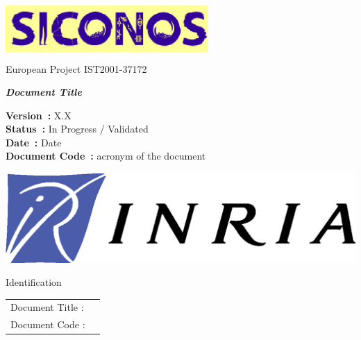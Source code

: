 \thispagestyle{empty}

\begin{center}
\includegraphics[height=23mm, width=77mm]{figure/siconos.eps}\\
\textsf{European Project IST2001-37172}\\[6cm]
\end{center}

\begin{center}
\huge
\textsf{\textbf{\textit{Document Title}}}\\[2.5cm]
\end{center}

\large
\begin{center}
\textsf{\textbf{Version~:} X.X}\\
\textsf{\textbf{Status~:}  In Progress / Validated}\\
\textsf{\textbf{Date~:} Date}\\
\textsf{\textbf{Document Code~:} acronym of the document}\\[5cm]

\end{center}

\normalsize

\begin{flushright}
\includegraphics[scale=0.3]{figure/Logo-INRIA.eps}
\end{flushright}

\clearpage


\normalsize

\begin{center}
  \textsf{\Large Identification}
\end{center}

\noindent\begin{tabular}{|p{}|p{}|}
\hline
Document Title : & \textsf{} \\
Document Code :  & \textsf{} \\
\hline
\end{tabular}
\textsf{ }\\


